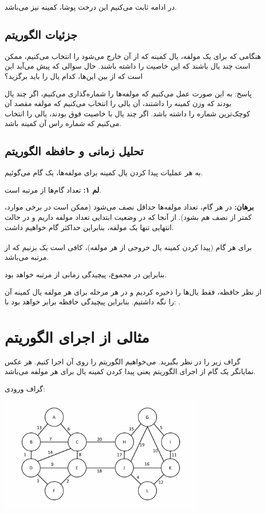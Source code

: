 \documentclass[11pt, oneside]{article}
\begin{document}
    در ادامه ثابت می‌کنیم این درخت پوشا، کمینه نیز می‌باشد.
    
\subsection{جزئیات الگوریتم}
هنگامی که برای یک مولفه، یال کمینه که از آن خارج می‌شود را انتخاب می‌کنیم، ممکن است چند یال باشند که این خاصیت را داشته باشند.
حال سوالی که پیش‌ می‌آید این است که از بین این‌ها، کدام یال را باید برگزید؟

پاسخ: به این صورت عمل می‌کنیم که مولفه‌ها را شماره‌گذاری می‌کنیم، اگر چند یال بودند که وزن کمینه را داشتند، آن یالی را انتخاب می‌کنیم که مولفه مقصد آن کوچک‌ترین شماره را داشته باشد.
اگر چند یال با خاصیت فوق بودند، یالی را انتخاب می‌کنیم که شماره راس آن کمینه باشد.

\subsection{تحلیل زمانی و حافظه الگوریتم}
\newcommand{\trace}[1]{\mathrm{Tr}\left\{#1\right\}}
به هر عملیات پیدا کردن یال کمینه برای مولفه‌ها، یک گام می‌گوئیم.

\textbf{لم ۱:} تعداد گام‌ها از مرتبه  است.

\textbf{برهان:}
در هر گام، تعداد مولفه‌ها حداقل نصف می‌شود (ممکن است در برخی موارد، کمتر از نصف هم بشود). از آنجا که در وضعیت ابتدایی تعداد  مولفه داریم و در حالت انتهایی تنها یک مولفه، بنابراین حداکثر  گام خواهیم داشت.
\\
\\
برای هر گام (پیدا کردن کمینه یال خروجی از هر مولفه)، کافی است یک  بزنیم که از مرتبه  می‌باشد.

بنابراین در مجموع، پیچیدگی زمانی از مرتبه  خواهد بود.

از نظر حافظه، فقط یال‌ها را ذخیره کردیم و در هر مرحله برای هر مولفه یال کمینه آن را نگه داشتیم. بنابراین پیچیدگی حافظه برابر خواهد بود با: .

\pagebreak
\section{مثالی از اجرای الگوریتم}
گراف زیر را در نظر بگیرید. می‌خواهیم الگوریتم را روی آن اجرا کنیم. هر عکس نمایانگر یک گام از اجرای الگوریتم یعنی پیدا کردن کمینه یال برای هر مولفه می‌باشد.

گراف ورودی:
\begin{center}
    \includegraphics[width=10cm]{resources/input-graph.png}\\[\bigskipamount]
\end{center}
\end{document}
